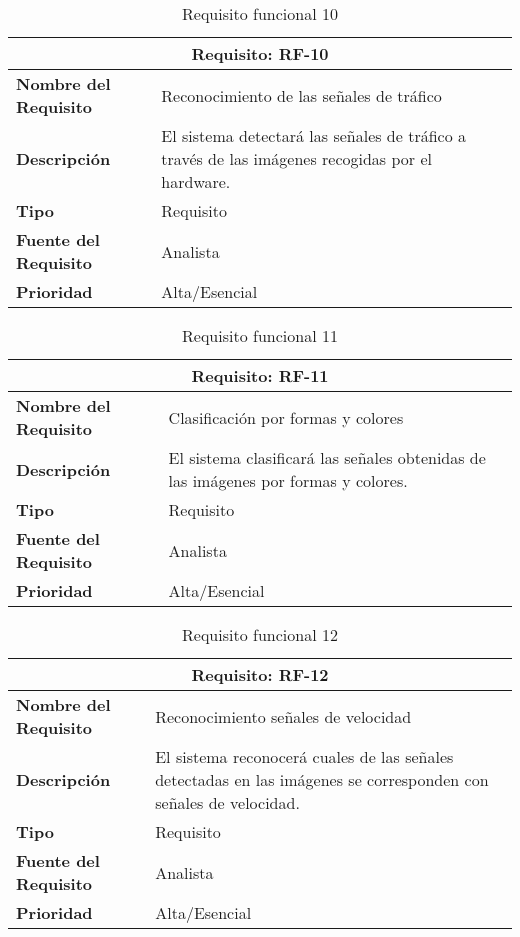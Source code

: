 \begin{table}[H]
\begin{center}
\begin{tabular}{p{} p{7cm}}
\multicolumn{2}{c}{\textbf{Requisito: RF-10} } \\
\hline \hline
\textbf{Nombre del Requisito} & Reconocimiento de las señales de tráfico \\
\hline
\textbf{Descripción} & El sistema detectará las señales de tráfico a través de las imágenes recogidas por el hardware. \\
\hline
\textbf{Tipo} & Requisito  \\
\hline
\textbf{Fuente del Requisito} & Analista  \\
\hline
\textbf{Prioridad} & Alta/Esencial  \\ \hline
\end{tabular}
\caption{Requisito funcional 10}
\label{tab:RF-10}
\end{center}
\end{table}

\begin{table}[H]
\begin{center}
\begin{tabular}{p{} p{7cm}}
\multicolumn{2}{c}{\textbf{Requisito: RF-11} } \\
\hline \hline
\textbf{Nombre del Requisito} &  Clasificación por formas y colores\\
\hline
\textbf{Descripción} & El sistema clasificará las señales obtenidas de las imágenes por formas y colores.\\
\hline
\textbf{Tipo} & Requisito \\
\hline
\textbf{Fuente del Requisito} & Analista \\
\hline
\textbf{Prioridad} & Alta/Esencial \\ \hline
\end{tabular}
\caption{Requisito funcional 11}
\label{tab:RF-11}
\end{center}
\end{table}

\begin{table}[H]
\begin{center}
\begin{tabular}{p{} p{7cm}}
\multicolumn{2}{c}{\textbf{Requisito: RF-12} } \\
\hline \hline
\textbf{Nombre del Requisito} &  Reconocimiento señales de velocidad \\
\hline
\textbf{Descripción} & El sistema reconocerá cuales de las señales detectadas en las imágenes se corresponden con señales de velocidad.
\\
\hline
\textbf{Tipo} & Requisito \\
\hline
\textbf{Fuente del Requisito} & Analista \\
\hline
\textbf{Prioridad} & Alta/Esencial \\ \hline
\end{tabular}
\caption{Requisito funcional 12}
\label{tab:RF-12}
\end{center}
\end{table}

